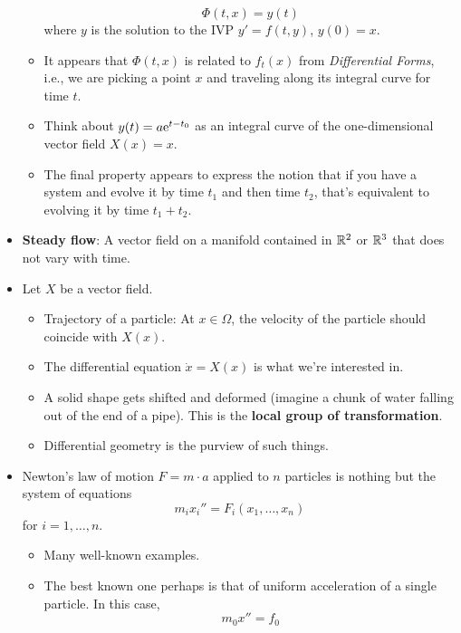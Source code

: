\documentclass[../notes.tex]{subfiles}
\begin{document}
\begin{itemize}
\begin{itemize}
        \begin{equation*}
            \Phi(t,x) = y(t)
        \end{equation*}
        where $y$ is the solution to the IVP $y'=f(t,y)$, $y(0)=x$.
        \item It appears that $\Phi(t,x)$ is related to $f_t(x)$ from \emph{Differential Forms}, i.e., we are picking a point $x$ and traveling along its integral curve for time $t$.
        \item Think about $y(t)=a\e[t-t_0]$ as an integral curve of the one-dimensional vector field $X(x)=x$.
        \item The final property appears to express the notion that if you have a system and evolve it by time $t_1$ and then time $t_2$, that's equivalent to evolving it by time $t_1+t_2$.
    \end{itemize}
    \item \textbf{Steady flow}: A vector field on a manifold contained in $\R^2$ or $\R^3$ that does not vary with time.
    \item Let $X$ be a vector field.
    \begin{itemize}
        \item Trajectory of a particle: At $x\in\Omega$, the velocity of the particle should coincide with $X(x)$.
        \item The differential equation $\dot{x}=X(x)$ is what we're interested in.
        \item A solid shape gets shifted and deformed (imagine a chunk of water falling out of the end of a pipe). This is the \textbf{local group of transformation}.
        \item Differential geometry is the purview of such things.
    \end{itemize}
    \item Newton's law of motion $F=m\cdot a$ applied to $n$ particles is nothing but the system of equations
    \begin{equation*}
        m_ix_i'' = F_i(x_1,\dots,x_n)
    \end{equation*}
    for $i=1,\dots,n$.
    \begin{itemize}
        \item Many well-known examples.
        \item The best known one perhaps is that of uniform acceleration of a single particle. In this case,
        \begin{equation*}
            m_0x'' = f_0
        \end{equation*}

\end{itemize}
\end{itemize}
\end{document}
